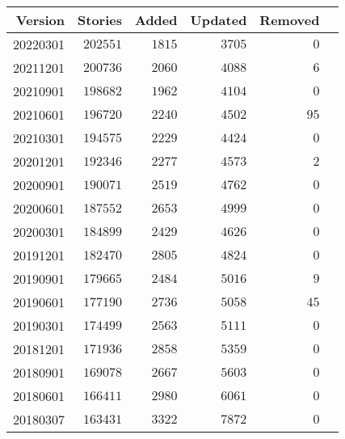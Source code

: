 \documentclass[hidelinks,a4paper,12pt]{article}
\begin{document}
\begin{center}
\begin{tabular}{|r|r|r|r|r|r|} \hline
\textbf{Version} & \textbf{Stories} & \textbf{Added} & \textbf{Updated} & \textbf{Removed} \\ \hline
20220301         & $202551$         & $1815$         & $3705$           & $0$              \\ \hline
20211201         & $200736$         & $2060$         & $4088$           & $6$              \\ \hline
20210901         & $198682$         & $1962$         & $4104$           & $0$              \\ \hline
20210601         & $196720$         & $2240$         & $4502$           & $95$             \\ \hline
20210301         & $194575$         & $2229$         & $4424$           & $0$              \\ \hline
20201201         & $192346$         & $2277$         & $4573$           & $2$              \\ \hline
20200901         & $190071$         & $2519$         & $4762$           & $0$              \\ \hline
20200601         & $187552$         & $2653$         & $4999$           & $0$              \\ \hline
20200301         & $184899$         & $2429$         & $4626$           & $0$              \\ \hline
20191201         & $182470$         & $2805$         & $4824$           & $0$              \\ \hline
20190901         & $179665$         & $2484$         & $5016$           & $9$              \\ \hline
20190601         & $177190$         & $2736$         & $5058$           & $45$             \\ \hline
20190301         & $174499$         & $2563$         & $5111$           & $0$              \\ \hline
20181201         & $171936$         & $2858$         & $5359$           & $0$              \\ \hline
20180901         & $169078$         & $2667$         & $5603$           & $0$              \\ \hline
20180601         & $166411$         & $2980$         & $6061$           & $0$              \\ \hline
20180307         & $163431$         & $3322$         & $7872$           & $0$              \\ \hline

\end{tabular}
\end{center}
\end{document}
